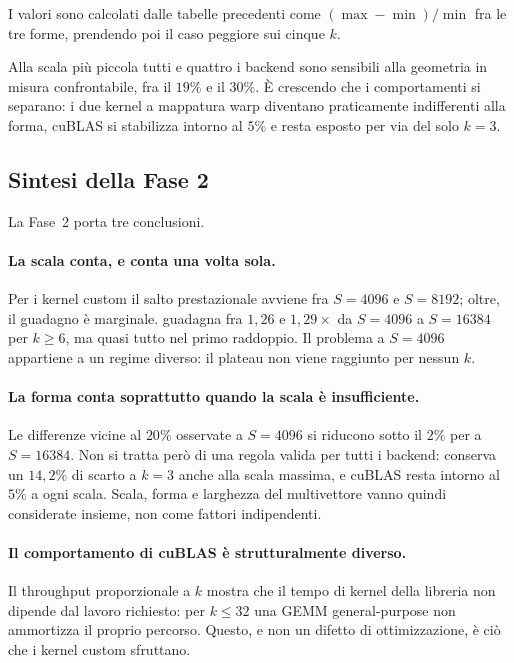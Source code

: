 I valori sono calcolati dalle tabelle precedenti come
$(\max-\min)/\min$ fra le tre forme, prendendo poi il caso peggiore sui cinque
$k$.

Alla scala più piccola tutti e quattro i backend sono sensibili alla geometria
in misura confrontabile, fra il $19\%$ e il $30\%$. È crescendo che i
comportamenti si separano: i due kernel a mappatura warp diventano
praticamente indifferenti alla forma, cuBLAS si stabilizza intorno al $5\%$ e
 resta esposto per via del solo $k=3$.


\subsection{Sintesi della Fase 2}
\label{sec:ris-fase2-sintesi}

La Fase~2 porta tre conclusioni.

\paragraph{La scala conta, e conta una volta sola.}
Per i kernel custom il salto prestazionale avviene fra $S=4096$ e $S=8192$;
oltre, il guadagno è marginale.  guadagna fra
$1{,}26$ e $1{,}29\times$ da $S=4096$ a $S=\num{16384}$ per $k\ge6$, ma quasi
tutto nel primo raddoppio. Il problema a $S=4096$ appartiene a un regime diverso: il
plateau non viene raggiunto per nessun $k$.

\paragraph{La forma conta soprattutto quando la scala è insufficiente.}
Le differenze vicine al $20\%$ osservate a $S=4096$ si riducono sotto il
$2\%$ per  a $S=\num{16384}$. Non si tratta però di una
regola valida per tutti i backend:  conserva un
$14{,}2\%$ di scarto a $k=3$ anche alla scala massima, e cuBLAS resta intorno
al $5\%$ a ogni scala. Scala, forma e larghezza del multivettore vanno quindi
considerate insieme, non come fattori indipendenti.

\paragraph{Il comportamento di cuBLAS è strutturalmente diverso.}
Il throughput proporzionale a $k$ mostra che il tempo di kernel della libreria
non dipende dal lavoro richiesto: per $k\le32$ una GEMM general-purpose non
ammortizza il proprio percorso. Questo, e non un difetto di ottimizzazione,
è ciò che i kernel custom sfruttano.

